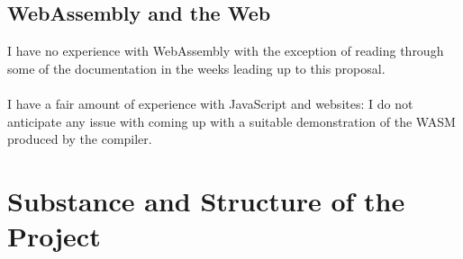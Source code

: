 \documentclass[12pt]{article}
\begin{document}
	\subsection*{WebAssembly and the Web}
	I have no experience with WebAssembly with the exception of reading through some of the documentation in the weeks leading up to this proposal.
	\\\\
	I have a fair amount of experience with JavaScript and websites: I do not anticipate any issue with coming up with a suitable demonstration of the WASM produced by the compiler.
	
	
	\section*{Substance and Structure of the Project}
	
	
	
\end{document}

